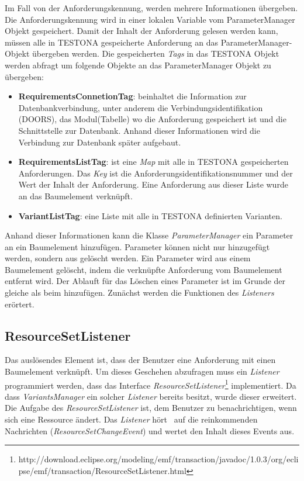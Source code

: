 Im Fall von der Anforderungskennung, werden mehrere Informationen übergeben. Die Anforderungskennung wird in einer lokalen Variable vom ParameterManager Objekt gespeichert. Damit der Inhalt der Anforderung gelesen werden kann, müssen alle in TESTONA gespeicherte Anforderung an das ParameterManager-Objekt übergeben werden. Die gespeicherten \textit{Tags} in das TESTONA Objekt werden abfragt um folgende Objekte an das ParameterManager Objekt zu übergeben:


\begin{itemize}
\item \textbf{RequirementsConnetionTag}: beinhaltet die Information zur Datenbankverbindung, unter anderem die Verbindungsidentifikation (DOORS), das Modul(Tabelle) wo die Anforderung gespeichert ist und die Schnittstelle zur Datenbank. Anhand dieser Informationen wird die Verbindung zur Datenbank später aufgebaut.
\item \textbf{RequirementsListTag}: ist eine \textit{Map} mit alle in TESTONA gespeicherten Anforderungen. Das \textit{Key} ist die Anforderungsidentifikationsnummer und der Wert der Inhalt der Anforderung. Eine Anforderung aus dieser Liste wurde an das Baumelement verknüpft.
\item \textbf{VariantListTag}: eine Liste mit alle in TESTONA definierten Varianten.
\end{itemize}


Anhand dieser Informationen kann die Klasse \textit{ParameterManager} ein Parameter an ein Baumelement hinzufügen. Parameter können nicht nur hinzugefügt werden, sondern aus gelöscht werden. Ein Parameter wird aus einem Baumelement gelöscht, indem die verknüpfte Anforderung vom Baumelement entfernt wird. Der Ablauft für das Löschen eines Parameter ist im Grunde der gleiche als beim hinzufügen. Zunächst werden die Funktionen des \textit{Listeners} erörtert.




\subsection{ResourceSetListener}\label{sub:RSListner}
Das auslösendes Element ist, dass der Benutzer eine Anforderung mit einen Baumelement verknüpft. Um dieses Geschehen abzufragen muss ein \textit{Listener} programmiert werden, dass das Interface \textit{ResourceSetListener}\footnote{http://download.eclipse.org/modeling/emf/transaction/javadoc/1.0.3/org/eclipse/emf/transaction/ResourceSetListener.html} implementiert. Da dass \textit{VariantsManager} ein solcher \textit{Listener} bereits besitzt, wurde dieser erweitert. Die Aufgabe des \textit{ResourceSetListener} ist, dem Benutzer zu benachrichtigen, wenn sich eine Ressource ändert. Das \textit{Listener}  \glqq hört\grqq~ auf die reinkommenden Nachrichten (\textit{ResourceSetChangeEvent}) und wertet den Inhalt dieses Events aus.\\

